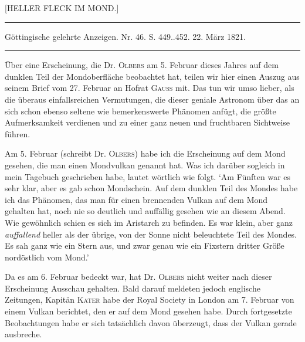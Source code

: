 \clearpage
{}
\begin{center}
{\large [HELLER FLECK IM MOND.]}
\end{center}

\begin{center}
\noindent\rule{\linewidth}{0.4pt}

Göttingische gelehrte Anzeigen. Nr. 46. S. 449..452. 22. März 1821.

\noindent\rule{\linewidth}{0.4pt}
\end{center}

Über eine Erscheinung, die Dr. \textsc{Olbers} am 5. Februar dieses Jahres auf dem dunklen Teil der Mondoberfläche beobachtet hat, teilen wir hier einen Auszug aus seinem Brief vom 27. Februar an Hofrat \textsc{Gauss} mit. Das tun wir umso lieber, als die überaus einfallsreichen Vermutungen, die dieser geniale Astronom über das an sich schon ebenso seltene wie bemerkenswerte Phänomen anfügt, die größte Aufmerksamkeit verdienen und zu einer ganz neuen und fruchtbaren Sichtweise führen.

Am 5. Februar (schreibt Dr. \textsc{Olbers}) habe ich die Erscheinung auf dem Mond gesehen, die man einen Mondvulkan genannt hat. Was ich darüber sogleich in mein Tagebuch geschrieben habe, lautet wörtlich wie folgt. `Am Fünften war es sehr klar, aber es gab schon Mondschein. Auf dem dunklen Teil des Mondes habe ich das Phänomen, das man für einen brennenden Vulkan auf dem Mond gehalten hat, noch nie so deutlich und auffällig gesehen wie an diesem Abend. Wie gewöhnlich schien es sich im Aristarch zu befinden. Es war klein, aber ganz \emph{auffallend} heller als der übrige, von der Sonne nicht beleuchtete Teil des Mondes. Es sah ganz wie ein Stern aus, und zwar genau wie ein Fixstern dritter Größe nordöstlich vom Mond.'

Da es am 6. Februar bedeckt war, hat Dr. \textsc{Olbers} nicht weiter nach dieser Erscheinung Ausschau gehalten. Bald darauf meldeten jedoch englische Zeitungen, Kapitän \textsc{Kater} habe der Royal Society in London am 7. Februar von einem Vulkan berichtet, den er auf dem Mond gesehen habe. Durch fortgesetzte Beobachtungen habe er sich tatsächlich davon überzeugt, dass der Vulkan gerade ausbreche.

